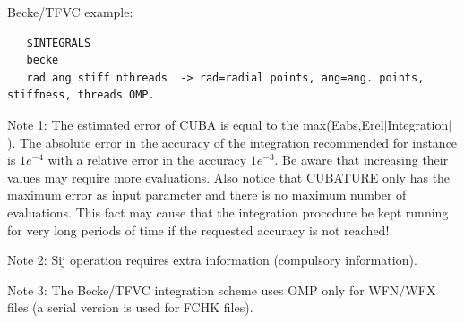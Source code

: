 \documentclass[10pt,a4paper]{article}
\begin{document}
\noindent Becke/TFVC example:\newline
\begin{verbatim}
   $INTEGRALS
   becke
   rad ang stiff nthreads  -> rad=radial points, ang=ang. points, stiffness, threads OMP.     
\end{verbatim}

\noindent Note 1: The estimated error of CUBA is equal to the max(Eabs,Erel$|$Integration$|$). The absolute error in the accuracy of the integration recommended for instance is $1e^{-4}$ with a relative error in the accuracy $1e^{-3}$. Be aware that increasing their values may require more evaluations. Also notice that CUBATURE only has the maximum error as input parameter and there is no maximum number of evaluations. This fact may cause that the integration procedure be kept running for very long periods of time if the requested accuracy is not reached!\newline

\noindent Note 2: Sij operation requires extra information (compulsory information).  \newline   

\noindent Note 3: The Becke/TFVC integration scheme uses OMP only for WFN/WFX files (a serial version is used for FCHK files).  \newline
\end{document}
